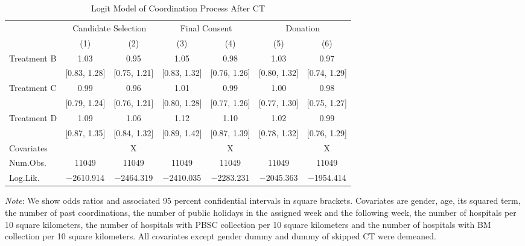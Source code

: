 \documentclass[12pt, a4paper]{article}
\begin{document}
\begin{table}[H]

\caption{\label{tab:logit-coordinate}Logit Model of Coordination Process After CT}
\centering
\fontsize{8}{10}\selectfont
\begin{threeparttable}
\begin{tabular}[t]{lcccccc}
\toprule
\multicolumn{1}{c}{ } & \multicolumn{2}{c}{Candidate Selection} & \multicolumn{2}{c}{Final Consent} & \multicolumn{2}{c}{Donation} \\
\cmidrule(l{3pt}r{3pt}){2-3} \cmidrule(l{3pt}r{3pt}){4-5} \cmidrule(l{3pt}r{3pt}){6-7}
  & (1) & (2) & (3) & (4) & (5) & (6)\\
\midrule
Treatment B & \num{1.03} & \num{0.95} & \num{1.05} & \num{0.98} & \num{1.03} & \num{0.97}\\
 & {}[\num{0.83}, \num{1.28}] & {}[\num{0.75}, \num{1.21}] & {}[\num{0.83}, \num{1.32}] & {}[\num{0.76}, \num{1.26}] & {}[\num{0.80}, \num{1.32}] & {}[\num{0.74}, \num{1.29}]\\
Treatment C & \num{0.99} & \num{0.96} & \num{1.01} & \num{0.99} & \num{1.00} & \num{0.98}\\
 & {}[\num{0.79}, \num{1.24}] & {}[\num{0.76}, \num{1.21}] & {}[\num{0.80}, \num{1.28}] & {}[\num{0.77}, \num{1.26}] & {}[\num{0.77}, \num{1.30}] & {}[\num{0.75}, \num{1.27}]\\
Treatment D & \num{1.09} & \num{1.06} & \num{1.12} & \num{1.10} & \num{1.02} & \num{0.99}\\
 & {}[\num{0.87}, \num{1.35}] & {}[\num{0.84}, \num{1.32}] & {}[\num{0.89}, \num{1.42}] & {}[\num{0.87}, \num{1.39}] & {}[\num{0.78}, \num{1.32}] & {}[\num{0.76}, \num{1.29}]\\
\midrule
Covariates &  & X &  & X &  & X\\
Num.Obs. & \num{11049} & \num{11049} & \num{11049} & \num{11049} & \num{11049} & \num{11049}\\
Log.Lik. & \num{-2610.914} & \num{-2464.319} & \num{-2410.035} & \num{-2283.231} & \num{-2045.363} & \num{-1954.414}\\
\bottomrule
\end{tabular}
\begin{tablenotes}
\item \emph{Note}: We show odds ratios and associated 95 percent confidential intervals in square brackets. Covariates are gender, age, its squared term, the number of past coordinations, the number of public holidays in the assigned week and the following week, the number of hospitals per 10 square kilometers, the number of hospitals with PBSC collection per 10 square kilometers and the number of hospitals with BM collection per 10 square kilometers. All covariates except gender dummy and dummy of skipped CT were demeaned.
\end{tablenotes}
\end{threeparttable}
\end{table}
\end{document}
